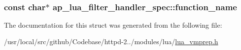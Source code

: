 \subsubsection[{\texorpdfstring{function\+\_\+name}{function_name}}]{\setlength{\rightskip}{0pt plus 5cm}const char$\ast$ ap\+\_\+lua\+\_\+filter\+\_\+handler\+\_\+spec\+::function\+\_\+name}\hypertarget{structap__lua__filter__handler__spec_a3257a246db41b9c853054fd50876ee3b}{}\label{structap__lua__filter__handler__spec_a3257a246db41b9c853054fd50876ee3b}


The documentation for this struct was generated from the following file\+:\begin{DoxyCompactItemize}
\item 
/usr/local/src/github/\+Codebase/httpd-\/2../modules/lua/\hyperlink{lua__vmprep_8h}{lua\+\_\+vmprep.\+h}\end{DoxyCompactItemize}
